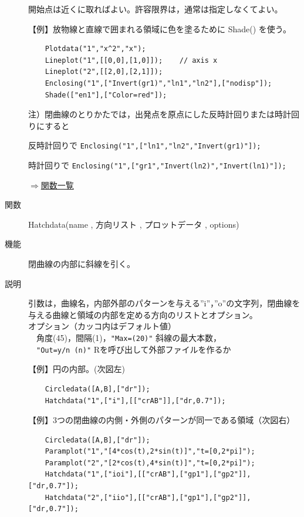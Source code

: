 \documentclass[papersize,a4paper,12pt,uplatex]{jsarticle}
\begin{document}
\begin{description}
開始点は近くに取ればよい。許容限界は，通常は指定しなくてよい。

\vspace{\baselineskip}
【例】放物線と直線で囲まれる領域に色を塗るために Shade() を使う。
\begin{verbatim}
    Plotdata("1","x^2","x");
    Lineplot("1",[[0,0],[1,0]]);    // axis x
    Lineplot("2",[[2,0],[2,1]]);
    Enclosing("1",["Invert(gr1)","ln1","ln2"],["nodisp"]);
    Shade(["en1"],["Color=red"]);
\end{verbatim}
\vspace{\baselineskip}
 \begin{center}  \end{center}

\vspace{\baselineskip}
注）閉曲線のとりかたでは，出発点を原点にした反時計回りまたは時計回りにすると

    反時計回りで  \verb|Enclosing("1",["ln1","ln2","Invert(gr1)"]);|

    時計回りで    \verb|Enclosing("1",["gr1","Invert(ln2)","Invert(ln1)"]);|

\begin{flushright}  \hyperlink{functionlist}{$\Rightarrow$関数一覧}\end{flushright}

\vspace{\baselineskip}
\hypertarget{hatchdata}{}
\item[関数]  Hatchdata(name , 方向リスト , プロットデータ , options)
\item[機能]  閉曲線の内部に斜線を引く。
\item[説明]  引数は，曲線名，内部外部のパターンを与える''i''，''o''の文字列，閉曲線を与える曲線と領域の内部を定める方向のリストとオプション。\\
オプション（カッコ内はデフォルト値）\\
　角度(45)，間隔(1)，\verb|"Max=(20)"| 斜線の最大本数，\\
　\verb|"Out=y/n (n)"| Rを呼び出して外部ファイルを作るか
  
\vspace{\baselineskip}
【例】円の内部。(次図左)
\begin{verbatim}
    Circledata([A,B],["dr"]);
    Hatchdata("1",["i"],[["crAB"]],["dr,0.7"]);
\end{verbatim}

【例】3つの閉曲線の内側・外側のパターンが同一である領域（次図右）
\begin{verbatim}
    Circledata([A,B],["dr"]);
    Paramplot("1","[4*cos(t),2*sin(t)]","t=[0,2*pi]");
    Paramplot("2","[2*cos(t),4*sin(t)]","t=[0,2*pi]");
    Hatchdata("1",["ioi"],[["crAB"],["gp1"],["gp2"]],["dr,0.7"]);
    Hatchdata("2",["iio"],[["crAB"],["gp1"],["gp2"]],["dr,0.7"]);
\end{verbatim}
\vspace{\baselineskip}
\hspace{5mm}  \hspace{5mm}    


\end{description}
\end{document}
